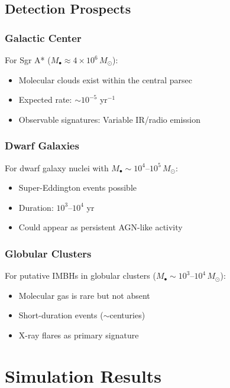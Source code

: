 \documentclass[twocolumn,amsmath,amssymb,prd,superscriptaddress,nofootinbib]{revtex4-2}
\begin{document}
\subsection{Detection Prospects}
\label{sec:detection}

\subsubsection{Galactic Center}

For Sgr A* ($M_\bullet \approx 4 \times 10^6\,M_\odot$):
\begin{itemize}
    \item Molecular clouds exist within the central parsec
    \item Expected rate: $\sim 10^{-5}$ yr$^{-1}$
    \item Observable signatures: Variable IR/radio emission
\end{itemize}

\subsubsection{Dwarf Galaxies}

For dwarf galaxy nuclei with $M_\bullet \sim 10^4$--$10^5\,M_\odot$:
\begin{itemize}
    \item Super-Eddington events possible
    \item Duration: $10^3$--$10^4$ yr
    \item Could appear as persistent AGN-like activity
\end{itemize}

\subsubsection{Globular Clusters}

For putative IMBHs in globular clusters ($M_\bullet \sim 10^3$--$10^4\,M_\odot$):
\begin{itemize}
    \item Molecular gas is rare but not absent
    \item Short-duration events ($\sim$centuries)
    \item X-ray flares as primary signature
\end{itemize}

\section{Simulation Results}
\label{sec:results}
\end{document}
